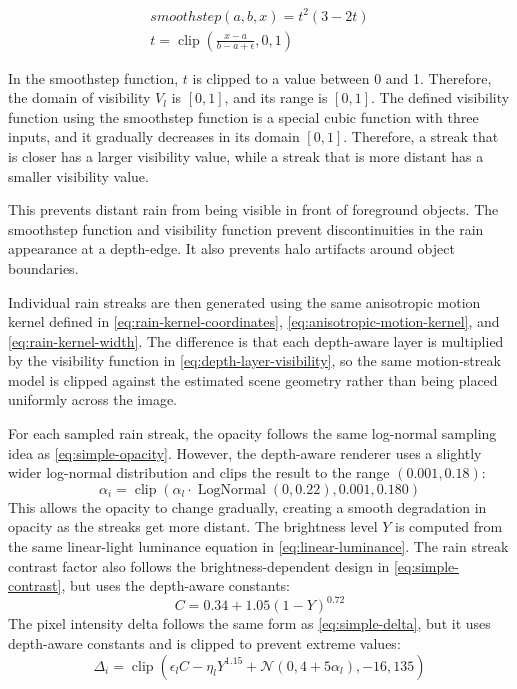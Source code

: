 \documentclass[10pt,letterpaper]{article}
\begin{document}
\[
\begin{aligned}
smoothstep(a, b, x) = t^2(3-2t) \\
t = \operatorname{clip}(\frac{x-a}{b-a+\epsilon}, 0, 1)
\end{aligned}
\]

In the smoothstep function, $t$ is clipped to a value between 0 and 1. Therefore, the domain of visibility $V_l$ is $[0, 1]$, and its range is $[0, 1]$.
The defined visibility function using the smoothstep function is a special cubic function with three inputs, and it gradually decreases in its domain $[0, 1]$. Therefore, a streak that is closer has
a larger visibility value, while a streak that is more distant has a smaller visibility value.

This prevents distant rain from being visible in front of foreground objects. The smoothstep function and visibility
function prevent discontinuities in the rain appearance at a depth-edge. It also prevents halo artifacts around object boundaries.

Individual rain streaks are then generated using the same anisotropic motion kernel defined in \autoref{eq:rain-kernel-coordinates}, \autoref{eq:anisotropic-motion-kernel}, and \autoref{eq:rain-kernel-width}. The difference is that each depth-aware layer is multiplied by the visibility function in \autoref{eq:depth-layer-visibility}, so the same motion-streak model is clipped against the estimated scene geometry rather than being placed uniformly across the image.

For each sampled rain streak, the opacity follows the same log-normal sampling idea as \autoref{eq:simple-opacity}. However, the depth-aware renderer uses 
a slightly wider log-normal distribution and clips the result to the range $(0.001,0.18)$:
\[
\alpha_i=\operatorname{clip}(\alpha_l \cdot \operatorname{LogNormal}(0,0.22),0.001,0.180)
\]
This allows the opacity to change gradually, creating a smooth degradation in opacity as the streaks get more distant. 
The brightness level $Y$ is computed from the same linear-light luminance equation in \autoref{eq:linear-luminance}. 
The rain streak contrast factor also follows the brightness-dependent design in \autoref{eq:simple-contrast}, but uses the depth-aware constants:
\[
C=0.34+1.05(1-Y)^{0.72}
\]
The pixel intensity delta follows the same form as \autoref{eq:simple-delta}, but it uses depth-aware constants and is clipped to prevent extreme values:
\[
\Delta_i=\operatorname{clip}(\epsilon_l C-\eta_lY^{1.15}+\mathcal{N}(0,4+5\alpha_l), -16, 135)
\]
\end{document}
